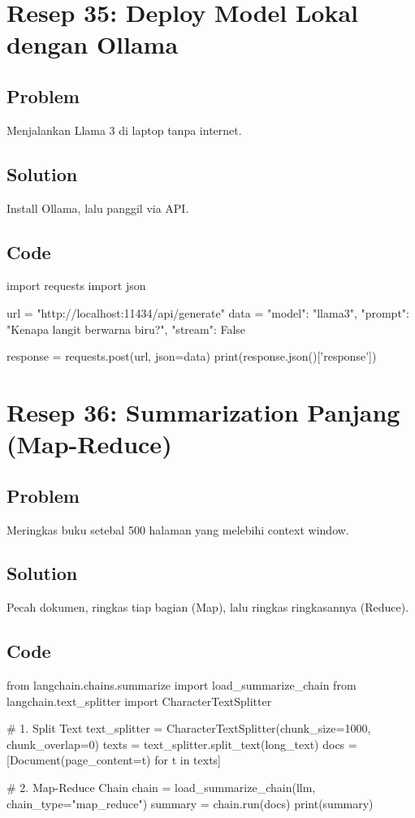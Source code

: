 \newpage

\section{Resep 35: Deploy Model Lokal dengan Ollama}

\subsection*{Problem}
Menjalankan Llama 3 di laptop tanpa internet.

\subsection*{Solution}
Install Ollama, lalu panggil via API.

\subsection*{Code}
\begin{codeblock}[language=Python]
import requests
import json

url = "http://localhost:11434/api/generate"
data = {
    "model": "llama3",
    "prompt": "Kenapa langit berwarna biru?",
    "stream": False
}

response = requests.post(url, json=data)
print(response.json()['response'])
\end{codeblock}

\newpage

\section{Resep 36: Summarization Panjang (Map-Reduce)}

\subsection*{Problem}
Meringkas buku setebal 500 halaman yang melebihi context window.

\subsection*{Solution}
Pecah dokumen, ringkas tiap bagian (Map), lalu ringkas ringkasannya (Reduce).

\subsection*{Code}
\begin{codeblock}[language=Python]
from langchain.chains.summarize import load_summarize_chain
from langchain.text_splitter import CharacterTextSplitter

# 1. Split Text
text_splitter = CharacterTextSplitter(chunk_size=1000, chunk_overlap=0)
texts = text_splitter.split_text(long_text)
docs = [Document(page_content=t) for t in texts]

# 2. Map-Reduce Chain
chain = load_summarize_chain(llm, chain_type="map_reduce")
summary = chain.run(docs)
print(summary)
\end{codeblock}


